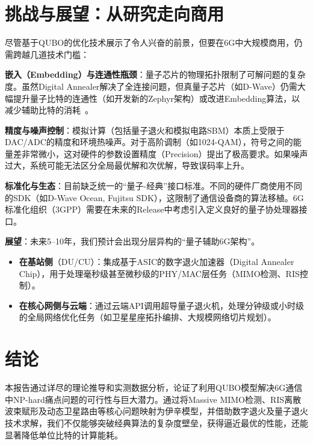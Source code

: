 \documentclass[12pt,a4paper]{article}
\begin{document}
\section{挑战与展望：从研究走向商用}

尽管基于QUBO的优化技术展示了令人兴奋的前景，但要在6G中大规模商用，仍需跨越几道技术门槛：

\textbf{嵌入（Embedding）与连通性瓶颈}：量子芯片的物理拓扑限制了可解问题的复杂度。虽然Digital Annealer解决了全连接问题，但真量子芯片（如D-Wave）仍需大幅提升量子比特的连通性（如开发新的Zephyr架构）或改进Embedding算法，以减少辅助比特的消耗~\cite{ref51}。

\textbf{精度与噪声控制}：模拟计算（包括量子退火和模拟电路SBM）本质上受限于DAC/\allowbreak ADC的精度和环境热噪声。对于高阶调制（如1024-QAM），符号之间的能量差非常微小，这对硬件的参数设置精度（Precision）提出了极高要求。如果噪声过大，系统可能无法区分全局最优解和次优解，导致误码率上升。

\textbf{标准化与生态}：目前缺乏统一的``量子-经典''接口标准。不同的硬件厂商使用不同的SDK（如D-Wave Ocean, Fujitsu SDK），这限制了通信设备商的算法移植。6G标准化组织（3GPP）需要在未来的Release中考虑引入定义良好的量子协处理器接口。

\textbf{展望}：未来5--10年，我们预计会出现分层异构的``量子辅助6G架构''。
\begin{itemize}
    \item \textbf{在基站侧}（DU/CU）：集成基于ASIC的数字退火加速器（Digital Annealer Chip），用于处理毫秒级甚至微秒级的PHY/MAC层任务（MIMO检测、RIS控制）。
    \item \textbf{在核心网侧与云端}：通过云端API调用超导量子退火机，处理分钟级或小时级的全局网络优化任务（如卫星星座拓扑编排、大规模网络切片规划）。
\end{itemize}


\section{结论}

本报告通过详尽的理论推导和实测数据分析，论证了利用QUBO模型解决6G通信中NP-hard痛点问题的可行性与巨大潜力。通过将Massive MIMO检测、RIS离散波束赋形及动态卫星路由等核心问题映射为伊辛模型，并借助数字退火及量子退火技术求解，我们不仅能够突破经典算法的复杂度壁垒，获得逼近最优的性能，还能显著降低单位比特的计算能耗。
\end{document}
